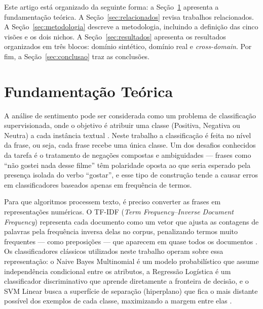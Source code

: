 \documentclass[12pt]{article}
\begin{document}
Este artigo está organizado da seguinte forma: a Seção~\ref{sec:fundamentacao} apresenta a fundamentação teórica. A Seção~\ref{sec:relacionados} revisa trabalhos relacionados. A Seção~\ref{sec:metodologia} descreve a metodologia, incluindo a definição das cinco visões e os dois nichos. A Seção~\ref{sec:resultados} apresenta os resultados organizados em três blocos: domínio sintético, domínio real e \textit{cross-domain}. Por fim, a Seção~\ref{sec:conclusao} traz as conclusões.



\section{Fundamentação Teórica}
\label{sec:fundamentacao}

A análise de sentimento pode ser considerada como um problema de classificação supervisionada, onde o objetivo é atribuir uma classe (Positiva, Negativa ou Neutra) a cada instância textual \cite{jm3}. Neste trabalho a classificação é feita no nível da frase, ou seja, cada frase recebe uma única classe. Um dos desafios conhecidos da tarefa é o tratamento de negações compostas e ambiguidades — frases como ``não gostei nada desse filme'' têm polaridade oposta ao que seria esperado pela presença isolada do verbo ``gostar'', e esse tipo de construção tende a causar erros em classificadores baseados apenas em frequência de termos.

Para que algoritmos processem texto, é preciso converter as frases em representações numéricas. O TF-IDF (\textit{Term Frequency–Inverse Document Frequency}) representa cada documento como um vetor que ajusta as contagens de palavras pela frequência inversa delas no corpus, penalizando termos muito frequentes — como preposições — que aparecem em quase todos os documentos \cite{rossi2019}. Os classificadores clássicos utilizados neste trabalho operam sobre essa representação: o Naive Bayes Multinomial é um modelo probabilístico que assume independência condicional entre os atributos, a Regressão Logística é um classificador discriminativo que aprende diretamente a fronteira de decisão, e o SVM Linear busca a superfície de separação (hiperplano) que fica o mais distante possível dos exemplos de cada classe, maximizando a margem entre elas \cite{pang2002}.
\end{document}
